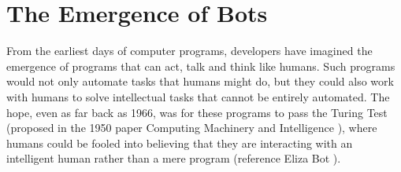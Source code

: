 \documentclass{sig-alternate}
\begin{document}
%
\author{
% 
%
\alignauthor
XXX\\
       \\
}

\date{29 Sept 2017}

\maketitle
%




\section{The Emergence of Bots} 


From the earliest days of computer programs, developers have imagined the emergence of programs that can act, talk and think like humans.
Such programs would not only automate tasks that humans might do, but they could also work with humans to solve intellectual tasks that cannot be entirely automated. 
The hope, even as far back as 1966, was for these programs to pass the Turing Test (proposed in the 1950 paper Computing Machinery and Intelligence \cite{Turing-1950}), where humans could be fooled into believing that they are interacting with an intelligent human rather than a mere program (reference Eliza Bot \cite{Weizenbaum:1966:ECP:365153.365168}). 
\end{document}
